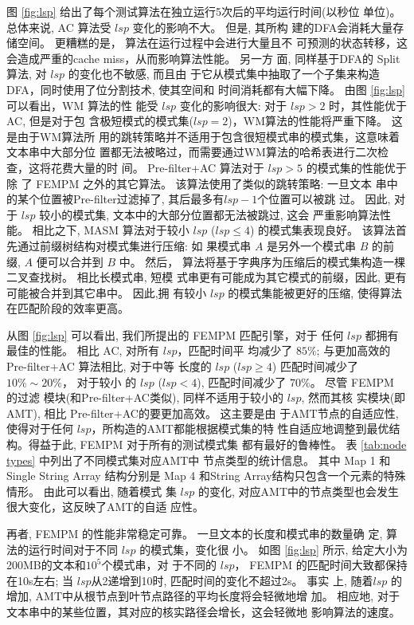 图 \ref{fig:lsp} 给出了每个测试算法在独立运行5次后的平均运行时间(以秒位
单位)。 总体来说, \textsf{AC} 算法受 $lsp$ 变化的影响不大。 但是, 其所构
建的DFA会消耗大量存储空间。 更糟糕的是， 算法在运行过程中会进行大量且不
可预测的状态转移，这会造成严重的cache miss，从而影响算法性能。 另一方
面, 同样基于DFA的 \textsf{Split} 算法, 对 $lsp$ 的变化也不敏感, 而且由
于它从模式集中抽取了一个子集来构造DFA，同时使用了位分割技术, 使其空间和
时间消耗都有大幅下降。 由图 \ref{fig:lsp} 可以看出，\textsf{WM} 算法的性
能受 $lsp$ 变化的影响很大: 对于 $lsp > 2$ 时，其性能优于AC, 但是对于包
含极短模式的模式集($lsp=2$)，WM算法的性能将严重下降。 这是由于WM算法所
用的跳转策略并不适用于包含很短模式串的模式集，这意味着文本串中大部分位
置都无法被略过，而需要通过WM算法的哈希表进行二次检查，这将花费大量的时
间。  \textsf{Pre-filter+AC} 算法对于 $lsp > 5$ 的模式集的性能优于除
了 \textsf{FEMPM} 之外的其它算法。 该算法使用了类似的跳转策略: 一旦文本
串中的某个位置被Pre-filter过滤掉了, 其后最多有$lsp-1$个位置可以被跳
过。 因此, 对于 $lsp$ 较小的模式集, 文本中的大部分位置都无法被跳过, 这会
严重影响算法性能。 相比之下, \textsf{MASM} 算法对于较小 $lsp$ ($lsp
\leq 4$) 的模式集表现良好。 该算法首先通过前缀树结构对模式集进行压缩: 如
果模式串 $A$ 是另外一个模式串 $B$ 的前缀, $A$ 便可以合并到 $B$ 中。 然后，
算法将基于字典序为压缩后的模式集构造一棵二叉查找树。 相比长模式串, 短模
式串更有可能成为其它模式的前缀，因此, 更有可能被合并到其它串中。 因此,拥
有较小 $lsp$ 的模式集能被更好的压缩, 使得算法在匹配阶段的效率更高。

从图 \ref{fig:lsp} 可以看出, 我们所提出的 \textsf{FEMPM} 匹配引擎，对于
任何 $lsp$ 都拥有最佳的性能。 相比 \textsf{AC}, 对所有 $lsp$，匹配时间平
均减少了 $85\%$; 与更加高效的\textsf{Pre-filter+AC} 算法相比, 对于中等
长度的 $lsp$ ($lsp \geq 4$) 匹配时间减少了 $10\% \sim 20\%$， 对于较小
的 $lsp$ ($lsp < 4$), 匹配时间减少了 $70\%$。 尽管 \textsf{FEMPM} 的过滤
模块(和\textsf{Pre-filter+AC}类似), 同样不适用于较小的 $lsp$, 然而其核
实模块(即AMT), 相比 \textsf{Pre-filter+AC}的要更加高效。 这主要是由
于AMT节点的自适应性, 使得对于任何 $lsp$，所构造的AMT都能根据模式集的特
性自适应地调整到最优结构。得益于此, \textsf{FEMPM} 对于所有的测试模式集
都有最好的鲁棒性。 表 \ref{tab:node types} 中列出了不同模式集对应AMT中
节点类型的统计信息。 其中 Map 1 和 Single String Array 结构分别是 Map
4 和String Array结构只包含一个元素的特殊情形。 由此可以看出, 随着模式
集 $lsp$ 的变化, 对应AMT中的节点类型也会发生很大变化，这反映了AMT的自适
应性。

再者, \textsf{FEMPM} 的性能非常稳定可靠。 一旦文本的长度和模式串的数量确
定, 算法的运行时间对于不同 $lsp$ 的模式集，变化很
小。 如图 \ref{fig:lsp} 所示, 给定大小为200MB的文本和$10^5$个模式串，对
于不同的 $lsp$， \textsf{FEMPM} 的匹配时间大致都保持
在10s左右; 当 $lsp$从2递增到10时, 匹配时间的变化不超过2s。 事实
上, 随着$lsp$ 的增加, AMT中从根节点到叶节点路径的平均长度将会轻微地增
加。 相应地, 对于文本串中的某些位置，其对应的核实路径会增长，这会轻微地
影响算法的速度。

